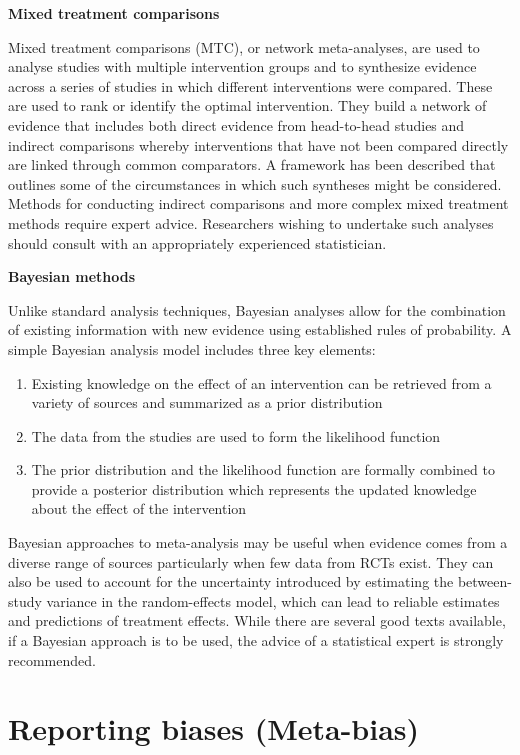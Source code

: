 \documentclass[
  10pt,
  a4paper,
  DIV=11,
  numbers=noendperiod]{scrreprt}
\begin{document}
\textbf{Mixed treatment comparisons}

Mixed treatment comparisons (MTC), or network meta-analyses, are used to
analyse studies with multiple intervention groups and to synthesize
evidence across a series of studies in which different interventions
were compared. These are used to rank or identify the optimal
intervention. They build a network of evidence that includes both direct
evidence from head-to-head studies and indirect comparisons whereby
interventions that have not been compared directly are linked through
common comparators. A framework has been described that outlines some of
the circumstances in which such syntheses might be considered. Methods
for conducting indirect comparisons and more complex mixed treatment
methods require expert advice. Researchers wishing to undertake such
analyses should consult with an appropriately experienced statistician.

\textbf{Bayesian methods}

Unlike standard analysis techniques, Bayesian analyses allow for the
combination of existing information with new evidence using established
rules of probability. A simple Bayesian analysis model includes three
key elements:

\begin{enumerate}
\def\labelenumi{\arabic{enumi}.}
\item
  Existing knowledge on the effect of an intervention can be retrieved
  from a variety of sources and summarized as a prior distribution
\item
  The data from the studies are used to form the likelihood function
\item
  The prior distribution and the likelihood function are formally
  combined to provide a posterior distribution which represents the
  updated knowledge about the effect of the intervention
\end{enumerate}

Bayesian approaches to meta-analysis may be useful when evidence comes
from a diverse range of sources particularly when few data from RCTs
exist. They can also be used to account for the uncertainty introduced
by estimating the between-study variance in the random-effects model,
which can lead to reliable estimates and predictions of treatment
effects. While there are several good texts available, if a Bayesian
approach is to be used, the advice of a statistical expert is strongly
recommended.

\section{Reporting biases
(Meta-bias)}\label{reporting-biases-meta-bias-1}
\end{document}
